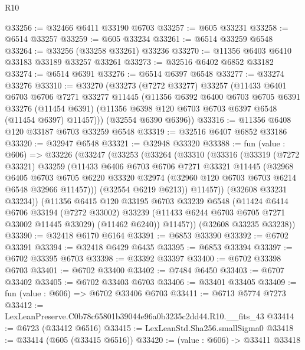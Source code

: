 \begin{lexlean}{R10}
\begin{coremodule}
@33256 := @32466 @6411 @33190 @6703
@33257 := @605 @33231
@33258 := @6514 @33257
@33259 := @605 @33234
@33261 := @6514 @33259 @6548
@33264 := @33256 (@33258 @33261) @33236
@33270 := @11356 @6403 @6410 @33183 @33189 @33257 @33261
@33273 := @32516 @6402 @6852 @33182
@33274 := @6514 @6391
@33276 := @6514 @6397 @6548
@33277 := @33274 @33276
@33310 := @33270
    (@33273
      (@7272 @33277)
      @33257
      (@11433
        @6401
        @6703
        @6706
        @7271
        @33277
        @11445
        (@11356
          @6392
          @6400
          @6703
          @6705
          @6391
          @33276
          (@11454 @6391)
          (@11356 @6398 @120 @6703 @6703 @6397 @6548 (@11454 @6397) @11457)))
      (@32554 @6390 @6396))
@33316 := @11356 @6408 @120 @33187 @6703 @33259 @6548
@33319 := @32516 @6407 @6852 @33186
@33320 := @32947 @6548
@33321 := @32948 @33320
@33388 := fun (value : @606) =>
  @33226
    (@33247
      (@33253
        (@33264
          (@33310
            (@33316
              (@33319
                (@7272 @33321)
                @33259
                (@11433
                  @6406
                  @6703
                  @6706
                  @7271
                  @33321
                  @11445
                  (@32968
                    @6405
                    @6703
                    @6705
                    @6220
                    @33320
                    @32974
                    (@32960 @120 @6703 @6703 @6214 @6548 @32966 @11457)))
                (@32554 @6219 @6213))
              @11457))
          (@32608 @33231 @33234))
        (@11356
          @6415
          @120
          @33195
          @6703
          @33239
          @6548
          (@11424
            @6414
            @6706
            @33194
            (@7272 @33002)
            @33239
            (@11433 @6244 @6703 @6705 @7271 @33002 @11445 @33029)
            (@11462 @6240))
          @11457))
      (@32608 @33235 @33238))
@33390 := @32418 @6170 @6164
@33391 := @6853 @33390
@33392 := @6702 @33391
@33394 := @32418 @6429 @6435
@33395 := @6853 @33394
@33397 := @6702 @33395 @6703
@33398 := @33392 @33397
@33400 := @6702 @33398 @6703
@33401 := @6702 @33400
@33402 := @7484 @6450
@33403 := @6707 @33402
@33405 := @6702 @33403 @6703
@33406 := @33401 @33405
@33409 := fun (value : @606) => @6702 @33406 @6703
@33411 := @6713 @5774 @7273
@33412 := LexLeanPreserve.C0b78c65801b39044e96a0b3235c2dd44.R10.__fits_43
@33414 := @6723 (@33412 @6516)
@33415 := LexLeanStd.Sha256.smallSigma0
@33418 := @33414 (@605 (@33415 @6516))
@33420 := (value : @606) -> @33411 @33418

\end{coremodule}
\end{lexlean}
